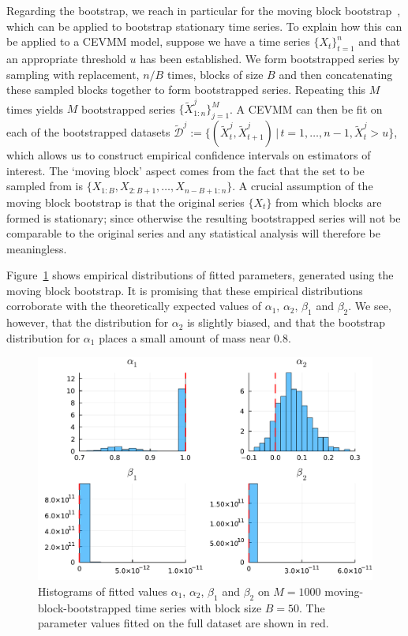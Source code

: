 \documentclass[11pt,twoside,openany]{book}
\newcommand{\D}{\mathcal{D}}
\numberwithin{Theorem}{chapter}
\numberwithin{Definition}{chapter}
\numberwithin{Lemma}{chapter}
\numberwithin{Algorithm}{chapter}
\numberwithin{equation}{chapter}
\begin{document}
Regarding the bootstrap, we reach in particular for the moving block
bootstrap~\citep{kunsch1989jackknife}, which can be applied to bootstrap stationary time series.
To explain how this can be applied to a CEVMM model,
suppose we have a time series $\{X_t\}_{t=1}^n$ and
that an appropriate threshold $u$ has been established. We form bootstrapped
series by sampling with replacement, $n/B$ times, blocks of size $B$ and then
concatenating these sampled blocks together to form bootstrapped series.
Repeating this $M$ times yields $M$ bootstrapped series
$\{\tilde{X}^j_{1:n}\}_{j=1}^M$.
A CEVMM can then be fit on each of the bootstrapped datasets
$\tilde{\D}^j := \{(\tilde{X}^j_{t},\tilde{X}^j_{t+1})\,|\,t=1,\ldots,n-1,\tilde{X}^j_{t}>u\}$,
which allows us to construct empirical confidence intervals on estimators
of interest.
The `moving block' aspect
comes from the fact that the set to be sampled from is $\{X_{1:B},X_{2:B+1},\ldots,X_{n-B+1:n}\}$.
A crucial assumption of the moving block bootstrap is that the original series $\{X_t\}$ from
which blocks are formed is stationary; since otherwise the resulting bootstrapped
series will not be comparable to the original series and any statistical analysis
will therefore be meaningless.

\FloatBarrier
Figure~\ref{fig:block_bootstrap_params} shows empirical distributions of fitted
parameters, generated using the moving
block bootstrap. It is promising that these empirical distributions corroborate
with the theoretically expected values of $\alpha_1,\,\alpha_2,\,\beta_1$ and
$\beta_2$. We see, however, that the distribution for $\alpha_2$ is slightly biased,
and that the bootstrap distribution for $\alpha_1$ places a small amount of mass near $0.8$.

\begin{figure}[htp]
  \centering
  \includegraphics[scale=0.75]{../ht-em/figures/block_bootstrap_params_final.pdf}
  \caption{Histograms of fitted values $\alpha_1$, $\alpha_2$, $\beta_1$ and $\beta_2$ on $M=1000$ moving-block-bootstrapped time series with block size $B=50$. The parameter values fitted
on the full dataset are shown in red.}\label{fig:block_bootstrap_params}
\end{figure}
\end{document}
